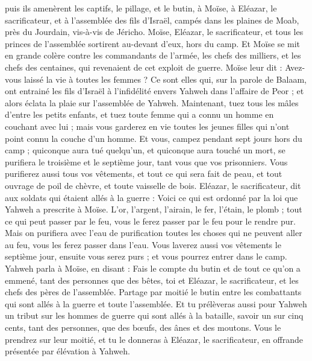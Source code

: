\begin{multicols}{2}
puis ils amenèrent les captifs, le pillage, et le butin, à Moïse, à Eléazar, le sacrificateur, et à l'assemblée des fils d'Israël, campés dans les plaines de Moab, près du Jourdain, vis-à-vis de Jéricho.
Moïse, Eléazar, le sacrificateur, et tous les princes de l'assemblée sortirent au-devant d'eux, hors du camp.
Et Moïse se mit en grande colère contre les commandants de l'armée, les chefs des milliers, et les chefs des centaines, qui revenaient de cet exploit de guerre.
Moïse leur dit : Avez-vous laissé la vie à toutes les femmes ?
Ce sont elles qui, sur la parole de Balaam, ont entrainé les fils d'Israël à l'infidélité envers Yahweh dans l'affaire de Peor ; et alors éclata la plaie sur l'assemblée de Yahweh.
Maintenant, tuez tous les mâles d'entre les petits enfants, et tuez toute femme qui a connu un homme en couchant avec lui ;
mais vous garderez en vie toutes les jeunes filles qui n'ont point connu la couche d'un homme.
Et vous, campez pendant sept jours hors du camp ; quiconque aura tué quelqu'un, et quiconque aura touché un mort, se purifiera le troisième et le septième jour, tant vous que vos prisonniers.
Vous purifierez aussi tous vos vêtements, et tout ce qui sera fait de peau, et tout ouvrage de poil de chèvre, et toute vaisselle de bois.
Eléazar, le sacrificateur, dit aux soldats qui étaient allés à la guerre : Voici ce qui est ordonné par la loi que Yahweh a prescrite à Moïse.
L'or, l'argent, l'airain, le fer, l'étain, le plomb ;
tout ce qui peut passer par le feu, vous le ferez passer par le feu pour le rendre pur. Mais on purifiera avec l'eau de purification toutes les choses qui ne peuvent aller au feu, vous les ferez passer dans l'eau.
Vous laverez aussi vos vêtements le septième jour, ensuite vous serez purs ; et vous pourrez entrer dans le camp.
Yahweh parla à Moïse, en disant :
Fais le compte du butin et de tout ce qu'on a emmené, tant des personnes que des bêtes, toi et Eléazar, le sacrificateur, et les chefs des pères de l'assemblée.
Partage par moitié le butin entre les combattants qui sont allés à la guerre et toute l'assemblée.
Et tu prélèveras aussi pour Yahweh un tribut sur les hommes de guerre qui sont allés à la bataille, savoir un sur cinq cents, tant des personnes, que des bœufs, des ânes et des moutons.
Vous le prendrez sur leur moitié, et tu le donneras à Eléazar, le sacrificateur, en offrande présentée par élévation à Yahweh.

\end{multicols}
